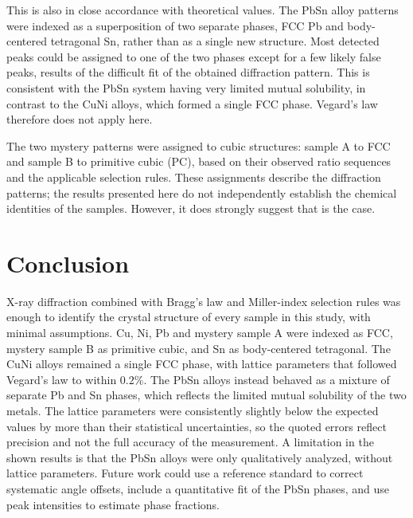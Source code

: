 \documentclass[12pt]{article}
\begin{document}
This is also in close accordance with theoretical
values. The PbSn alloy patterns were indexed as a superposition of two separate phases, FCC Pb and body-centered tetragonal Sn, rather than as a single new structure. Most detected peaks could be assigned to one of the two phases except
for a few likely false peaks, results of the difficult fit of the obtained diffraction pattern. This is consistent with the PbSn system having very limited mutual solubility, in
contrast to the CuNi alloys, which formed a single FCC phase. Vegard's law therefore does not apply here.

The two mystery patterns were assigned to cubic structures: sample A to FCC and sample B to primitive cubic (PC), based on their observed ratio sequences and the applicable selection rules. These assignments describe
the diffraction patterns; the results presented here do not independently establish the chemical identities of the samples. However, it does strongly suggest that is the case.


\section{Conclusion}\label{sec:con}
X-ray diffraction combined with Bragg's law and Miller-index selection rules was enough to identify the crystal structure of every sample in this study, with minimal assumptions. Cu, Ni, Pb and mystery sample A were indexed as FCC,
mystery sample B as primitive cubic, and Sn as body-centered tetragonal. The CuNi alloys remained a single FCC phase, with lattice parameters that followed Vegard's law to within $0.2\%$. The PbSn alloys instead behaved as a mixture
of separate Pb and Sn phases, which reflects the limited mutual solubility of the two metals. The lattice parameters were consistently slightly below the expected values by more than their statistical uncertainties, so the quoted errors
reflect precision and not the full accuracy of the measurement. A limitation in the shown results is that the PbSn alloys were only qualitatively analyzed, without lattice parameters. Future work could use a reference standard to correct systematic
angle offsets, include a quantitative fit of the PbSn phases, and use peak intensities to estimate phase fractions.

\newpage





\end{document}

